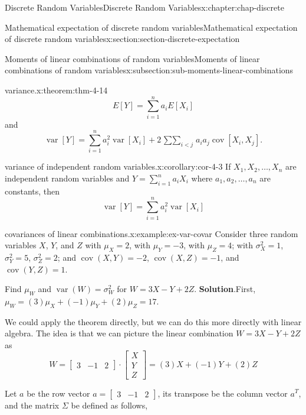 \documentclass[oneside,10pt,]{book}
\newcommand{\blocktitlefont}{\relax}
\newcommand{\lt}{<}
\newcommand{\amp}{&}
\begin{document}
\begin{chapterptx}{Discrete Random Variables}{}{Discrete Random Variables}{}{}{x:chapter:chap-discrete}
\begin{sectionptx}{Mathematical expectation of discrete random variables}{}{Mathematical expectation of discrete random variables}{}{}{x:section:section-discrete-expectation}
\begin{subsectionptx}{Moments of linear combinations of random variables}{}{Moments of linear combinations of random variables}{}{}{x:subsection:sub-moments-linear-combinations}
\begin{theorem}{variance.}{}{x:theorem:thm-4-14}
\begin{equation*}
E[Y] = \sum_{i=1}^n
a_iE[X_i]
\end{equation*}
and%
\begin{equation*}
\operatorname{var}[Y] = \sum_{i=1}^n a_i^2
\operatorname{var}[X_i] + 2 \mathop{\sum \sum}_{i \lt j} a_i
a_j\operatorname{cov}[X_i,X_j]\text{.}
\end{equation*}
%
\end{theorem}
\begin{corollary}{variance of independent random variables.}{}{x:corollary:cor-4-3}%
If \(\displaystyle X_1, X_2, \dots, X_n\) are independent random variables and \(\displaystyle Y = \sum_{i=1}^n a_iX_i\) where \(\displaystyle a_1, a_2, \dots, a_n\) are constants, then%
\begin{equation*}
\operatorname{var}[Y] = \sum_{i=1}^n
a_i^2\operatorname{var}[X_i]
\end{equation*}
%
\end{corollary}
\begin{example}{covariances of linear combinations.}{x:example:ex-var-covar}%
Consider three random variables \(X\), \(Y\), and \(Z\) with \(\mu_X = 2\), with \(\mu_Y = -3\), with \(\mu_Z = 4\); with \(\sigma_X^2 = 1\), \(\sigma_Y^2 = 5\), \(\sigma_Z^2 =
2\); and \(\operatorname{cov}(X, Y) = -2\), \(\operatorname{cov}(X, Z) =
-1\), and \(\operatorname{cov}(Y, Z) = 1\).%
\par
Find \(\mu_W\) and \(\operatorname{var}(W) = \sigma_W^2\) for \(W = 3X-Y+2Z\).%
\textbf{\blocktitlefont Solution}.\quad{}First, \(\mu_W = (3)\mu_X + (-1)\mu_Y + (2)\mu_Z = 17\).%
\par
We could apply the theorem directly, but we can do this more directly with linear algebra. The idea is that we can picture the linear combination \(W = 3X-Y+2Z\) as%
\begin{equation*}
W =
\left[\begin{array}{ccc}3 \amp -1 \amp
2\end{array}\right]\cdot\left[\begin{array}{c}X \\Y\\
Z\end{array}\right] = (3)X + (-1)Y + (2)Z
\end{equation*}
%
\par
Let \(a\) be the row vector \(a = \left[\begin{array}{ccc}3 \amp -1
\amp 2\end{array}\right]\), its transpose be the column vector \(a^T\), and the matrix \(\Sigma\) be defined as follows,%

\end{example}
\end{subsectionptx}
\end{sectionptx}
\end{chapterptx}
\end{document}
